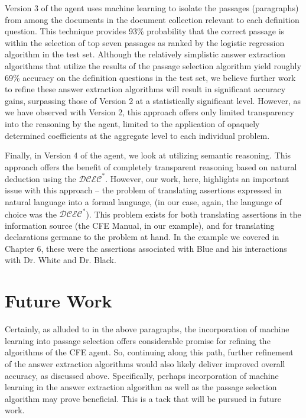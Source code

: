 Version 3 of the agent uses machine learning to isolate the passages (paragraphs) from among the documents in the document collection relevant to each definition question. This technique provides 93\% probability that the correct passage is within the selection of top seven passages as ranked by the logistic regression
algorithm in the test set. Although the relatively simplistic answer extraction algorithms that utilize the results of the passage selection algorithm yield roughly 69\% accuracy on the definition questions in the test set, we believe further work to refine these answer extraction algorithms will result in significant accuracy gains, surpassing those of Version 2 at a statistically significant level. However, as we have observed with Version 2, this approach offers only limited transparency into the reasoning by the agent, limited to the application of opaquely determined coefficients at the aggregate level to each individual problem.

Finally, in Version 4 of the agent, we look at utilizing semantic reasoning. This approach offers the benefit of completely transparent reasoning based on natural deduction using the $\mathcal{DCEC}^\ast$.  However, our work, here, highlights an important issue with this approach -- the problem of translating assertions expressed in natural language into a formal language, (in our case, again, the language of choice was the $\mathcal{DCEC}^\ast$).  This problem exists for both translating assertions in the information source (the CFE Manual, in our example), and for translating declarations germane to the problem at hand. In the example we covered in Chapter 6, these were the assertions associated with Blue and his interactions with Dr. White and Dr. Black.

\section{Future Work}

Certainly, as alluded to in the above paragraphs, the incorporation of machine learning into passage selection offers considerable promise for refining the algorithms of the CFE agent. So, continuing along this path, further refinement of the answer extraction algorithms would also likely deliver improved overall accuracy, as discussed above. Specifically, perhaps incorporation of machine learning in the answer extraction algorithm as well as the passage selection algorithm may prove beneficial. This is a tack that will be pursued in future work.


